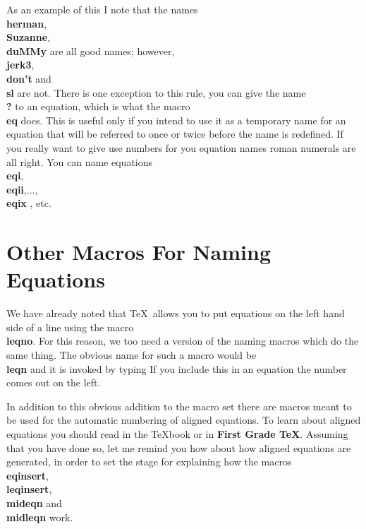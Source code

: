 As an example of this I note that the names {\bf \\herman},
{\bf \\Suzanne}, {\bf \\duMMy } are all good names; however,
{\bf \\jerk3}, {\bf \\don't} and {\bf \\sl} are not.
There is one exception to this rule, you can give the name {\bf \\?}
to an equation, which is what the macro {\bf \\eq} does.
This is useful only if you intend to use it as a temporary name
for an equation that will be referred to once or twice before
the name is redefined.
If you really want to give use numbers for you equation names
roman numerals are all right.
You can name equations {\bf \\eqi},{\bf \\eqii},$\ldots$,
{\bf \\eqix }, etc.
 
\section{Other Macros For Naming Equations}
 
We have already noted that \TeX\ allows you to put equations
on the left hand side of a line using the macro {\bf \\leqno}.
For this reason, we too need a version of the naming macros
which do the same thing.
The obvious name for such a macro would be {\bf \\leqn}
and it is invoked by typing
If you include this in an equation the number comes out on the left.
 
In addition to this obvious addition to the macro set
there are macros meant to be used for the automatic numbering of
aligned equations.
To learn about aligned equations you should read in the \TeX book
or in {\bf First Grade \TeX }.
Assuming that you have done so, let me remind you how about how
aligned equations are generated, in order to set the stage for
explaining how the macros {\bf \\eqinsert}, {\bf \\leqinsert},
{\bf \\mideqn} and {\bf \\midleqn} work.
 
